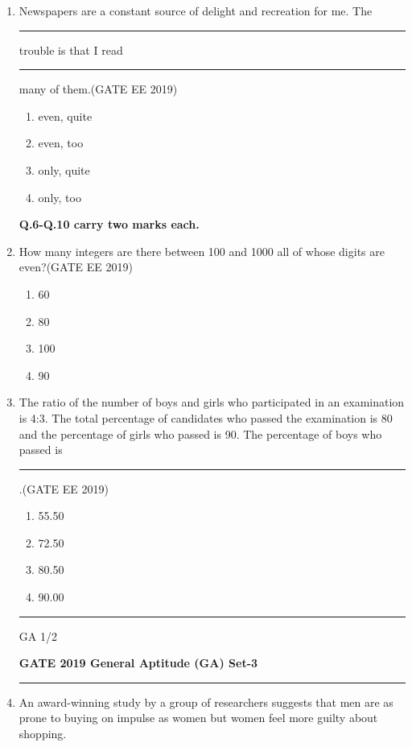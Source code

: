 \documentclass[a4paper,10pt]{exam}
\theoremstyle{remark}
\begin{document}
\begin{enumerate}
\begin{multicols}{4}
\end{multicols}
\item  Newspapers are a constant source of delight and recreation for me. The \rule{1cm}{0.15mm} trouble is that I read  \rule{1cm}{0.15mm}many of them.\hfill{(GATE EE 2019)}
\begin{multicols}{4}
\begin{enumerate}
\item even, quite
\item even, too
\item only, quite
\item only, too
\end{enumerate}
\end{multicols}
\textbf{Q.6-Q.10 carry two marks each.}
\item How many integers are there between 100 and 1000 all of whose digits are even?\hfill{(GATE EE 2019)}
\begin{multicols}{4}
\begin{enumerate}
\item 60
\item 80
\item 100
\item 90
\end{enumerate}
\end{multicols}
\item The ratio of the number of boys and girls who participated in an examination is 4:3. The total percentage of candidates who passed the examination is 80 and the percentage of girls who passed is 90. The percentage of boys who passed is
 \rule{1.5cm}{0.15mm}.\hfill{(GATE EE 2019)}
\begin{multicols}{4}
\begin{enumerate}
\item 55.50
\item 72.50
\item 80.50
\item 90.00
\end{enumerate}
\end{multicols}
\vfill
\noindent\rule{\linewidth}{0.4pt}
GA \hfill 1/2
\newpage
\raggedright{\textbf{GATE 2019 General Aptitude (GA) Set-3}}\\
\vspace{2.5mm}
\noindent\rule{\linewidth}{0.4pt}
\item An award-winning study by a group of researchers suggests that men are as prone to buying on impulse as women but women feel more guilty about shopping.\\

\end{enumerate}
\end{document}
